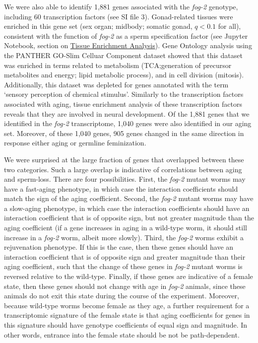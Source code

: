 \documentclass[10pt,letterpaper,twocolumn]{article}
\newcommand{\fog}{\emph{\mbox{fog-2}}}
\newcommand{\fogn}{1,881}
\newcommand{\coexpressed}{905}
\newcommand{\intersectn}{1,040}
\newcommand{\tffog}{60}
\begin{document}
We were also able to identify \fogn{} genes associated with the \fog{} genotype, including \tffog{} transcription factors (see SI file 3). Gonad-related tissues were enriched in this gene set (sex organ; midbody; somatic gonad, $q < 0.1$ for all), consistent with the function of \fog{} as a sperm specification factor (see Jupyter Notebook, section on \href{https://wormlabcaltech.github.io/Angeles_Leighton_2016/RNASeqAnalysis.html#Run-TEA}{Tissue Enrichment Analysis}). Gene Ontology analysis using the PANTHER GO-Slim Celluar Component dataset showed that this dataset was enriched in terms related to metabolism (TCA;\@ generation of precursor metabolites and energy; lipid metabolic process), and in cell division (mitosis).
Additionally, this dataset was depleted for genes annotated with the term `sensory perception of chemical stimulus'.  Similarly to the transcription factors associated with aging, tissue enrichment analysis of these transcription factors reveals that they are involved in neural development. Of the \fogn{} genes that we identified in the \fog{} transcriptome, \intersectn{} genes were also identified in our aging set. Moreover, of these \intersectn{}  genes, \coexpressed{} genes changed in the same direction in response either aging or germline feminization.

We were surprised at the large fraction of genes that overlapped between these two categories. Such a large overlap is indicative of correlations between aging and sperm-loss. There are four possibilities. First, the \fog{} mutant worms may have a fast-aging phenotype, in which case the interaction coefficients should match the sign of the aging coefficient. Second, the \fog{} mutant worms may have a slow-aging phenotype, in which case the interaction coefficients should have an interaction coefficient that is of opposite sign, but not greater magnitude than the aging coefficient (if a gene increases in aging in a wild-type worm, it should still increase in a \fog{} worm, albeit more slowly).
Third, the \fog{} worms exhibit a rejuvenation phenotype. If this is the case, then these genes should have an interaction coefficient that is of opposite sign and greater magnitude than their aging coefficient, such that the change of these genes in \fog{} mutant worms is reversed relative to the wild-type.
Finally, if these genes are indicative of a female state, then these genes should not change with age in \fog{} animals, since these animals do not exit this state during the course of the experiment. Moreover, because wild-type worms become female as they age, a further requirement for a transcriptomic signature of the female state is that aging coefficients for genes in this signature should have genotype coefficients of equal sign and magnitude. In other words, entrance into the female state should be not be path-dependent.
\end{document}
